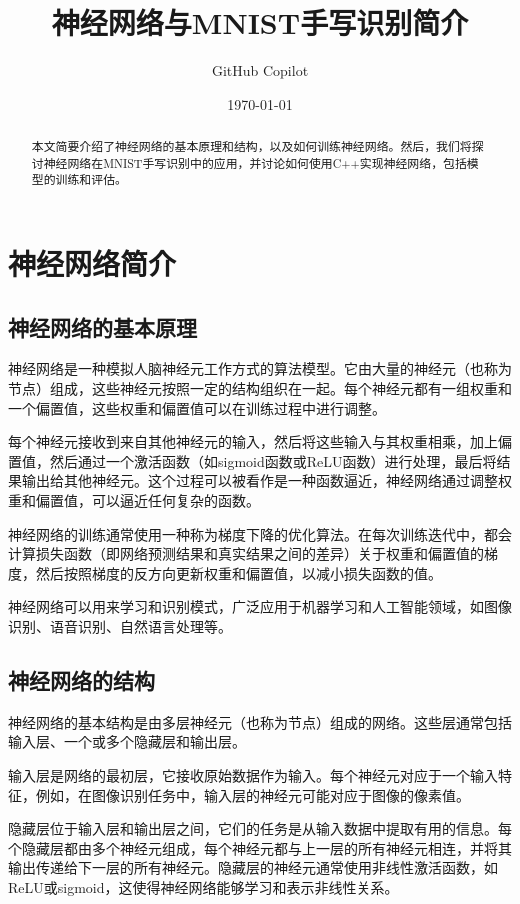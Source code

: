 \documentclass{ctexart}
\title{神经网络与MNIST手写识别简介}
\author{GitHub Copilot}
\date{\today}
\begin{document}
\maketitle

\begin{abstract}
本文简要介绍了神经网络的基本原理和结构，以及如何训练神经网络。然后，我们将探讨神经网络在MNIST手写识别中的应用，并讨论如何使用C++实现神经网络，包括模型的训练和评估。
\end{abstract}

\tableofcontents

\section{神经网络简介}
    \subsection{神经网络的基本原理}
    神经网络是一种模拟人脑神经元工作方式的算法模型。它由大量的神经元（也称为节点）组成，这些神经元按照一定的结构组织在一起。每个神经元都有一组权重和一个偏置值，这些权重和偏置值可以在训练过程中进行调整。

    每个神经元接收到来自其他神经元的输入，然后将这些输入与其权重相乘，加上偏置值，然后通过一个激活函数（如sigmoid函数或ReLU函数）进行处理，最后将结果输出给其他神经元。这个过程可以被看作是一种函数逼近，神经网络通过调整权重和偏置值，可以逼近任何复杂的函数。

    神经网络的训练通常使用一种称为梯度下降的优化算法。在每次训练迭代中，都会计算损失函数（即网络预测结果和真实结果之间的差异）关于权重和偏置值的梯度，然后按照梯度的反方向更新权重和偏置值，以减小损失函数的值。

    神经网络可以用来学习和识别模式，广泛应用于机器学习和人工智能领域，如图像识别、语音识别、自然语言处理等\cite{Goodfellow-et-al-2016}。
    \subsection{神经网络的结构}
    神经网络的基本结构是由多层神经元（也称为节点）组成的网络。这些层通常包括输入层、一个或多个隐藏层和输出层。

    输入层是网络的最初层，它接收原始数据作为输入。每个神经元对应于一个输入特征，例如，在图像识别任务中，输入层的神经元可能对应于图像的像素值。

    隐藏层位于输入层和输出层之间，它们的任务是从输入数据中提取有用的信息。每个隐藏层都由多个神经元组成，每个神经元都与上一层的所有神经元相连，并将其输出传递给下一层的所有神经元。隐藏层的神经元通常使用非线性激活函数，如ReLU或sigmoid，这使得神经网络能够学习和表示非线性关系。
\end{document}
